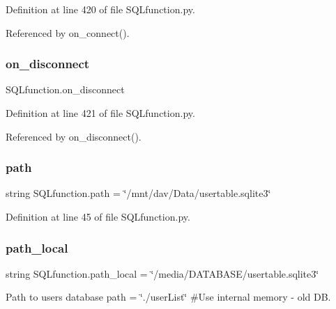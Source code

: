 Definition at line 420 of file S\+Q\+Lfunction.\+py.



Referenced by on\+\_\+connect().

\mbox{\label{namespace_s_q_lfunction_ab3031ccbbdb3f5a04bd7d66ceb4494c7}} 
\subsubsection{\texorpdfstring{on\+\_\+disconnect}{on\_disconnect}}
{\footnotesize\ttfamily S\+Q\+Lfunction.\+on\+\_\+disconnect}



Definition at line 421 of file S\+Q\+Lfunction.\+py.



Referenced by on\+\_\+disconnect().

\mbox{\label{namespace_s_q_lfunction_a9239421845b9e0921bad7a2a191f3849}} 
\subsubsection{\texorpdfstring{path}{path}}
{\footnotesize\ttfamily string S\+Q\+Lfunction.\+path = \char`\"{}/mnt/dav/Data/usertable.\+sqlite3\char`\"{}}



Definition at line 45 of file S\+Q\+Lfunction.\+py.

\mbox{\label{namespace_s_q_lfunction_a50744e6ca7c6cbd547746acb907f016e}} 
\subsubsection{\texorpdfstring{path\+\_\+local}{path\_local}}
{\footnotesize\ttfamily string S\+Q\+Lfunction.\+path\+\_\+local = \char`\"{}/media/D\+A\+T\+A\+B\+A\+SE/usertable.\+sqlite3\char`\"{}}



Path to users database path = \char`\"{}./user\+List\char`\"{} \#\+Use internal memory -\/ old DB. 




